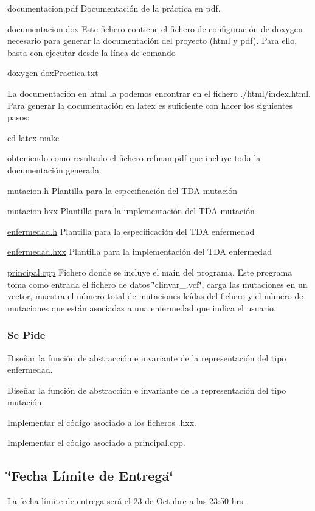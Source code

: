 \begin{DoxyItemize}
\item documentacion.\-pdf Documentación de la práctica en pdf. \item \hyperlink{documentacion_8dox}{documentacion.\-dox} Este fichero contiene el fichero de configuración de doxygen necesario para generar la documentación del proyecto (html y pdf). Para ello, basta con ejecutar desde la línea de comando 
\begin{DoxyCode}
doxygen doxPractica.txt
\end{DoxyCode}
 La documentación en html la podemos encontrar en el fichero ./html/index.html. Para generar la documentación en latex es suficiente con hacer los siguientes pasos\-: 
\begin{DoxyCode}
cd latex
make
\end{DoxyCode}
 obteniendo como resultado el fichero refman.\-pdf que incluye toda la documentación generada.\end{DoxyItemize}
\begin{DoxyItemize}
\item \hyperlink{mutacion_8h}{mutacion.\-h} Plantilla para la especificación del T\-D\-A mutación \item mutacion.\-hxx Plantilla para la implementación del T\-D\-A mutación \item \hyperlink{enfermedad_8h}{enfermedad.\-h} Plantilla para la especificación del T\-D\-A enfermedad \item \hyperlink{enfermedad_8hxx}{enfermedad.\-hxx} Plantilla para la implementación del T\-D\-A enfermedad\end{DoxyItemize}
\begin{DoxyItemize}
\item \hyperlink{principal_8cpp}{principal.\-cpp} Fichero donde se incluye el main del programa. Este programa toma como entrada el fichero de datos \char`\"{}clinvar\-\_.\-vcf\char`\"{}, carga las mutaciones en un vector, muestra el número total de mutaciones leídas del fichero y el número de mutaciones que están asociadas a una enfermedad que indica el usuario.\end{DoxyItemize}
\hypertarget{index_ssPide}{}\subsubsection{Se Pide}\label{index_ssPide}
\begin{DoxyItemize}
\item Diseñar la función de abstracción e invariante de la representación del tipo enfermedad. \item Diseñar la función de abstracción e invariante de la representación del tipo mutación. \item Implementar el código asociado a los ficheros .hxx. \item Implementar el código asociado a \hyperlink{principal_8cpp}{principal.\-cpp}.\end{DoxyItemize}
\hypertarget{index_fecha}{}\subsection{\char`\"{}\-Fecha Límite de Entrega\char`\"{}}\label{index_fecha}
La fecha límite de entrega será el 23 de Octubre a las 23\-:50 hrs. 
